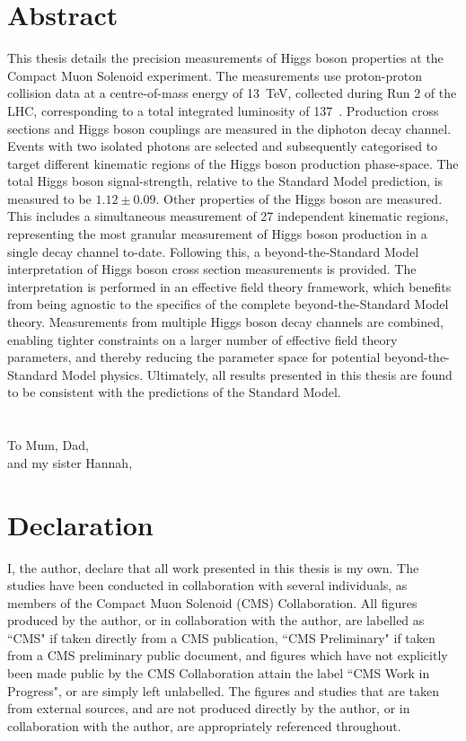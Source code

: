 \chapter*{\centering Abstract}
This thesis details the precision measurements of Higgs boson properties at the Compact Muon Solenoid experiment. The measurements use proton-proton collision data at a centre-of-mass energy of 13~TeV, collected during Run 2 of the LHC, corresponding to a total integrated luminosity of 137~\fbinv. Production cross sections and Higgs boson couplings are measured in the diphoton decay channel. Events with two isolated photons are selected and subsequently categorised to target different kinematic regions of the Higgs boson production phase-space. The total Higgs boson signal-strength, relative to the Standard Model prediction, is measured to be $1.12 \pm 0.09$. Other properties of the Higgs boson are measured. This includes a simultaneous measurement of 27 independent kinematic regions, representing the most granular measurement of Higgs boson production in a single decay channel to-date.
Following this, a beyond-the-Standard Model interpretation of Higgs boson cross section measurements is provided. The interpretation is performed in an effective field theory framework, which benefits from being agnostic to the specifics of the complete beyond-the-Standard Model theory. Measurements from multiple Higgs boson decay channels are combined, enabling tighter constraints on a larger number of effective field theory parameters, and thereby reducing the parameter space for potential beyond-the-Standard Model physics. Ultimately, all results presented in this thesis are found to be consistent with the predictions of the Standard Model.

\chapter*{\centering }%
\begin{center}
    \thispagestyle{empty}
    To Mum, Dad,\\ and my sister Hannah,
\end{center}


\chapter*{\centering Declaration}
I, the author, declare that all work presented in this thesis is my own. The studies have been conducted in collaboration with several individuals, as members of the Compact Muon Solenoid (CMS) Collaboration. All figures produced by the author, or in collaboration with the author, are labelled as ``CMS" if taken directly from a CMS publication, ``CMS Preliminary" if taken from a CMS preliminary public document, and figures which have not explicitly been made public by the CMS Collaboration attain the label ``CMS Work in Progress", or are simply left unlabelled. The figures and studies that are taken from external sources, and are not produced directly by the author, or in collaboration with the author, are appropriately referenced throughout.

